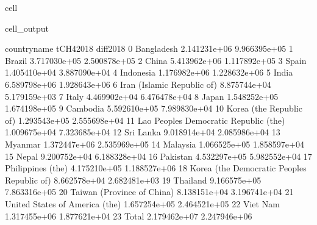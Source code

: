 \documentclass[letterpaper,10pt,english]{jupyterBook}
\begin{document}
\begin{sphinxuseclass}{cell}
\begin{sphinxVerbatimOutput}
\begin{sphinxuseclass}{cell_output}
\begin{sphinxVerbatim}[commandchars=\\\{\}]
                                   country\PYGZus{}name     tCH4\PYGZus{}2018     diff\PYGZus{}2018  \PYGZbs{}
0                                    Bangladesh  2.141231e+06 \PYGZhy{}9.966395e+05   
1                                        Brazil  3.717030e+05 \PYGZhy{}2.500878e+05   
2                                         China  5.413962e+06 \PYGZhy{}1.117892e+05   
3                                         Spain  1.405410e+04  3.887090e+04   
4                                     Indonesia  1.176982e+06  1.228632e+06   
5                                         India  6.589798e+06 \PYGZhy{}1.928643e+06   
6                    Iran (Islamic Republic of)  8.875744e+04  5.179159e+03   
7                                         Italy  4.469902e+04  6.476478e+04   
8                                         Japan  1.548252e+05  1.674198e+05   
9                                      Cambodia  5.592610e+05 \PYGZhy{}7.989830e+04   
10                      Korea (the Republic of)  1.293543e+05  2.555698e+04   
11       Lao People\PYGZsq{}s Democratic Republic (the)  1.009675e+04  7.323685e+04   
12                                    Sri Lanka  9.018914e+04  2.085986e+04   
13                                      Myanmar  1.372447e+06 \PYGZhy{}2.535969e+05   
14                                     Malaysia  1.066525e+05  1.858597e+04   
15                                        Nepal  9.200752e+04  6.188328e+04   
16                                     Pakistan  4.532297e+05 \PYGZhy{}5.982552e+04   
17                            Philippines (the)  4.175210e+05  1.188527e+06   
18  Korea (the Democratic People\PYGZsq{}s Republic of)  8.662578e+04 \PYGZhy{}2.682481e+03   
19                                     Thailand  9.166575e+05  7.863316e+05   
20                   Taiwan (Province of China)  8.138151e+04 \PYGZhy{}3.196741e+04   
21               United States of America (the)  1.657254e+05  2.464521e+05   
22                                     Viet Nam  1.317455e+06  1.877621e+04   
23                                        Total  2.179462e+07  2.247946e+06   


\end{sphinxVerbatim}
\end{sphinxuseclass}
\end{sphinxVerbatimOutput}
\end{sphinxuseclass}
\end{document}
